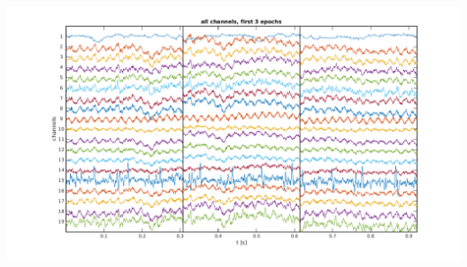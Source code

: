 \documentclass[10pt,a4paper,notitlepage]{report}
\begin{document}
\vspace{1cm}
\hspace{-1cm} \includegraphics[scale=0.5]{p3fig1.png}
\end{document}
